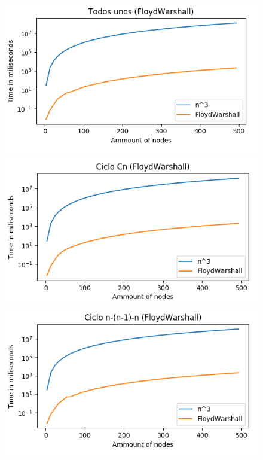 \documentclass[11pt,a4paper]{article}
\begin{document}
\begin{figure}[h]
    \includegraphics[scale=0.5]{FWlog-unos.png}
    \includegraphics[scale=0.5]{FWlog-cn.png}
    \includegraphics[scale=0.5]{FWlog-nnl1n.png}
\end{figure}
\end{document}
